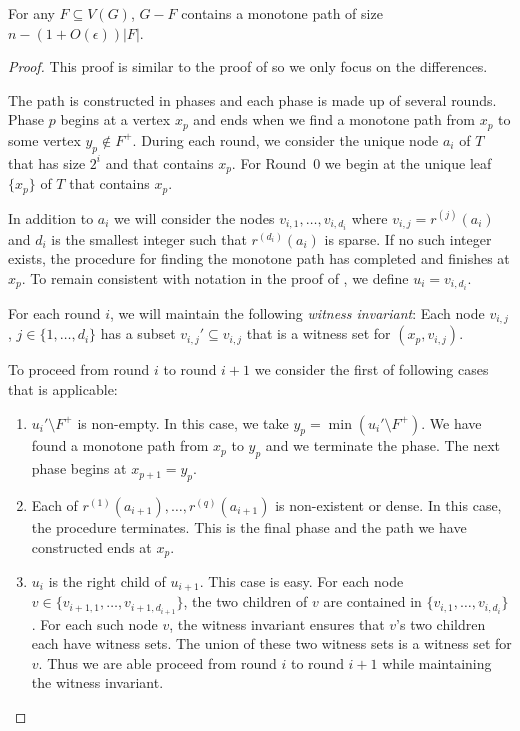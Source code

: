 \documentclass{patmorin}
\begin{document}
\begin{clm}
  For any $F\subseteq V(G)$, $G-F$ contains a monotone path of size
  $n-(1+O(\epsilon))|F|$.
\end{clm}

\begin{proof}
   This proof is similar to the proof of 
   so we only focus on the differences.

   The path is constructed in phases and each phase is made up of
   several rounds.  Phase $p$ begins at a vertex $x_p$ and ends when
   we find a monotone path from $x_p$ to some vertex $y_{p}\not\in
   F^+$. During each round, we consider the unique node $a_i$ of $T$
   that has size $2^i$ and that contains $x_p$. For Round~0 we begin at
   the unique leaf $\{x_p\}$ of $T$ that contains $x_p$.

   In addition to $a_i$ we will consider the nodes
   $v_{i,1},\ldots,v_{i,d_i}$ where $v_{i,j}=r^{(j)}(a_i)$ and $d_i$
   is the smallest integer such that $r^{(d_i)}(a_i)$ is sparse.  If no
   such integer exists, the procedure for finding the monotone path has
   completed and finishes at $x_p$.
   To remain consistent with notation in 
   the proof of , we define $u_i=v_{i,d_i}$.

   For each round $i$, we will maintain the following \emph{witness
   invariant}: Each node $v_{i,j}$, $j\in\{1,\ldots,d_i\}$ has a subset
	$v_{i,j}'\subseteq v_{i,j}$ that is a witness set for $(x_p,v_{i,j})$.
  
   To proceed from round $i$ to round $i+1$ we consider the first of following cases that is applicable:
 
   \begin{enumerate}
      \item $u_i'\setminus F^+$ is non-empty. In this case,
	we take $y_p = \min(u_i'\setminus F^+)$. We
        have found a monotone path from $x_p$ to $y_{p}$ and we terminate
        the phase.  The next phase begins at $x_{p+1}=y_p$.

      \item Each of $r^{(1)}(a_{i+1}),\ldots,r^{(q)}(a_{i+1})$ is
        non-existent or dense.  In this case, the procedure terminates.
        This is the final phase and the path we have constructed ends at $x_p$.

       \item $u_i$ is the right child of $u_{i+1}$.
   This case is easy. For each node
   $v\in\{v_{i+1,1},\ldots,v_{i+1,d_{i+1}}\}$, the two children
   of $v$ are contained in $\{v_{i,1},\ldots,v_{i,d_i}\}$.
   For each such node $v$, the witness invariant ensures that
   $v$'s two children each have witness sets.  The union of these
   two witness sets is a witness set for $v$.  Thus we are
   able proceed from round $i$ to round $i+1$ while maintaining
   the witness invariant.


\end{enumerate}
\end{proof}
\end{document}

